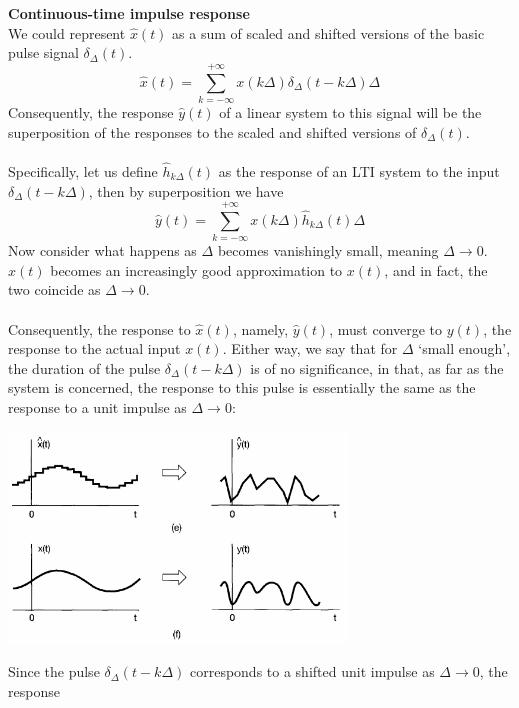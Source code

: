 \documentclass{report}
\begin{document}
\noindent\textbf{Continuous-time impulse response}\\
We could represent $\hat{x}(t)$ as a sum of scaled and shifted versions of the basic pulse signal $\delta_\Delta(t)$.
\begin{equation*}
\hat{x}(t)=\sum^{+\infty}_{k=-\infty}x(k\Delta)\delta_\Delta(t-k\Delta)\Delta
\end{equation*}
Consequently, the response $\hat{y}(t)$ of a linear system to this signal will be the superposition of the responses to the scaled
and shifted versions of $\delta_\Delta(t)$.\\
\vspace{1mm}\\
Specifically, let us define $\hat{h}_{k\Delta}(t)$ as the response of an LTI system to the input $\delta_\Delta(t-k\Delta)$, then 
by superposition we have
\begin{equation*}
\hat{y}(t)=\sum^{+\infty}_{k=-\infty}x(k\Delta)\hat{h}_{k\Delta}(t)\Delta
\end{equation*}
Now consider what happens as $\Delta$ becomes vanishingly small, meaning $\Delta\to0$. $\hat{x}(t)$ becomes an increasingly good 
approximation to $x(t)$, and in fact, the two coincide as $\Delta\to0$.\\
\vspace{1mm}\\
Consequently, the response to $\hat{x}(t)$, namely, $\hat{y}(t)$, must converge to $y(t)$, the response to the actual input 
$x(t)$. Either way, we say that for $\Delta$ `small enough', the duration of the pulse $\delta_\Delta(t-k\Delta)$ is of no 
significance, in that, as far as the system is concerned, the 
response to this pulse is essentially the same as the response to a unit impulse as $\Delta\to0$:
\begin{center}
\includegraphics[width=9cm]{a31}\\
\end{center}
Since the pulse $\delta_\Delta(t-k\Delta)$ corresponds to a shifted unit impulse as $\Delta\to0$, the response 
\end{document}
